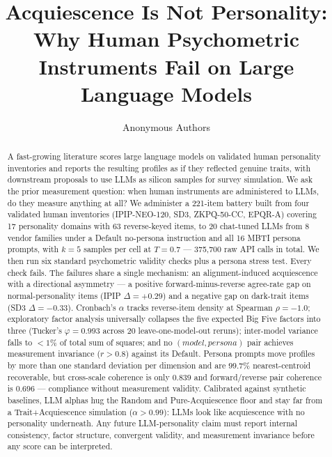 \documentclass[11pt]{article}
\title{Acquiescence Is Not Personality: \\ Why Human Psychometric Instruments Fail on Large Language Models}
\author{Anonymous Authors}
\begin{document}
\maketitle

\begin{abstract}
A fast-growing literature scores large language models on validated human personality inventories and reports the resulting profiles as if they reflected genuine traits, with downstream proposals to use LLMs as silicon samples for survey simulation. We ask the prior measurement question: when human instruments are administered to LLMs, do they measure anything at all? We administer a 221-item battery built from four validated human inventories (IPIP-NEO-120, SD3, ZKPQ-50-CC, EPQR-A) covering 17 personality domains with 63 reverse-keyed items, to 20 chat-tuned LLMs from 8 vendor families under a Default no-persona instruction and all 16 MBTI persona prompts, with $k{=}5$ samples per cell at $T{=}0.7$ --- 375{,}700 raw API calls in total. We then run six standard psychometric validity checks plus a persona stress test. Every check fails. The failures share a single mechanism: an alignment-induced acquiescence with a directional asymmetry --- a positive forward-minus-reverse agree-rate gap on normal-personality items (IPIP $\Delta{=}{+}0.29$) and a negative gap on dark-trait items (SD3 $\Delta{=}{-}0.33$). Cronbach's $\alpha$ tracks reverse-item density at Spearman $\rho{=}{-}1.0$; exploratory factor analysis universally collapses the five expected Big Five factors into three (Tucker's $\varphi{=}0.993$ across 20 leave-one-model-out reruns); inter-model variance falls to ${<}1\%$ of total sum of squares; and no $(model, persona)$ pair achieves measurement invariance ($r{>}0.8$) against its Default. Persona prompts move profiles by more than one standard deviation per dimension and are $99.7\%$ nearest-centroid recoverable, but cross-scale coherence is only $0.839$ and forward/reverse pair coherence is $0.696$ --- compliance without measurement validity. Calibrated against synthetic baselines, LLM alphas hug the Random and Pure-Acquiescence floor and stay far from a Trait+Acquiescence simulation ($\alpha{>}0.99$): LLMs look like acquiescence with no personality underneath. Any future LLM-personality claim must report internal consistency, factor structure, convergent validity, and measurement invariance before any score can be interpreted.
\end{abstract}

\end{document}
